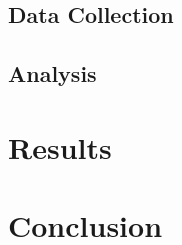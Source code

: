 \documentclass[12pt, a4paper]{article}
\begin{document}
\subsection{Data Collection}

\subsection{Analysis}

\section{Results}

\section{Conclusion}

\listoffigures
\listoftables



\end{document}
